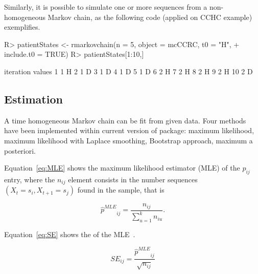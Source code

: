 \documentclass[nojss]{jss}
\begin{document}
Similarly, it is possible to simulate one or more sequences from a non-homogeneous Markov chain, 
as the following code (applied on CCHC example) exemplifies.

\begin{Schunk}
\begin{Sinput}
R> patientStates <- rmarkovchain(n = 5, object = mcCCRC, t0 = "H", 
+                                include.t0 = TRUE)
R> patientStates[1:10,]
\end{Sinput}
\begin{Soutput}
   iteration values
1          1      H
2          1      D
3          1      D
4          1      D
5          1      D
6          2      H
7          2      H
8          2      H
9          2      H
10         2      D
\end{Soutput}
\end{Schunk}

\subsection{Estimation}

A time homogeneous Markov chain can be fit from given data. Four methods have been implemented within current version of
 package: maximum likelihood, maximum likelihood with Laplace
smoothing, Bootstrap approach, maximum a posteriori. 

Equation~\ref{eq:MLE} shows the maximum likelihood estimator (MLE) of the
$p_{ij}$ entry, where the $n_{ij}$ element consists in the number sequences $\left( X_{t}=s_{i}, X_{t+1}=s_{j}\right)$
found in the sample, that is

\begin{equation}
{\hat p^{MLE}}_{ij} = \frac{{{n_{ij}}}}{{\sum\limits_{u = 1}^k {{n_{iu}}} }}.
\label{eq:MLE}
\end{equation}

Equation~\ref{eq:SE} shows the  of the MLE~\citep{MSkuriat}.

\begin{equation}
SE_{ij} = \frac{ {\hat p^{MLE}}_{ij} }{\sqrt{n_{ij}}}
\label{eq:SE}
\end{equation}
\end{document}
